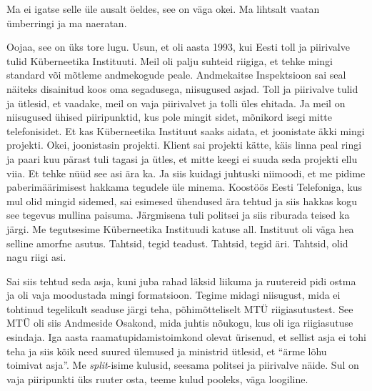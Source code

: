 
Ma ei igatse selle üle ausalt öeldes, see on väga okei. Ma lihtsalt vaatan 
ümberringi ja ma naeratan. 


Oojaa, see on üks tore lugu. Usun, et oli aasta 1993, kui Eesti toll ja 
piirivalve tulid Küberneetika Instituuti. Meil 
oli palju suhteid riigiga, et tehke mingi standard või mõtleme andmekogude 
peale. Andmekaitse Inspektsioon sai seal 
näiteks disainitud koos oma segadusega,  niisugused asjad. 
Toll ja piirivalve  tulid ja ütlesid, et 
 vaadake, meil on vaja piirivalvet ja tolli üles ehitada. Ja meil on niisugused 
ühised piiripunktid, kus pole  mingit sidet, mõnikord isegi mitte 
telefonisidet. Et kas Küberneetika Instituut saaks aidata, et joonistate äkki 
mingi projekti. Okei, joonistasin projekti. Klient sai projekti kätte, käis 
linna peal ringi ja paari kuu pärast tuli tagasi ja ütles, et mitte keegi ei 
suuda seda projekti ellu viia. Et tehke nüüd  see asi ära ka. Ja siis kuidagi 
juhtuski niimoodi, et me pidime paberimäärimisest hakkama tegudele üle minema. 
Koostöös Eesti Telefoniga, kus mul olid mingid sidemed, 
sai  esimesed ühendused  ära tehtud ja siis hakkas kogu see tegevus mullina  
paisuma. Järgmisena tuli politsei ja siis riburada teised ka järgi. Me 
tegutsesime Küberneetika Instituudi katuse all. Instituut oli väga hea selline 
amorfne asutus. Tahtsid, tegid teadust. Tahtsid, tegid äri. Tahtsid, olid nagu 
riigi asi.

Sai siis tehtud seda asja, kuni juba  rahad läksid liikuma ja ruutereid pidi 
ostma ja oli vaja moodustada mingi formatsioon. Tegime midagi niisugust, mida 
ei tohtinud tegelikult seaduse järgi teha, põhimõtteliselt MTÜ riigiasutustest. 
See MTÜ oli siis Andmeside Osakond, mida  juhtis nõukogu, kus oli iga riigiasutuse esindaja. Iga 
aasta raamatupidamistoimkond  olevat ürisenud, et sellist asja ei tohi teha ja 
siis kõik need suured ülemused ja ministrid ütlesid, et \enquote{ärme lõhu 
toimivat asja}. Me \emph{split}-isime  kulusid, seesama politsei ja piirivalve 
näide. Sul on vaja piiripunkti üks ruuter osta, teeme kulud pooleks, väga 
loogiline. 


